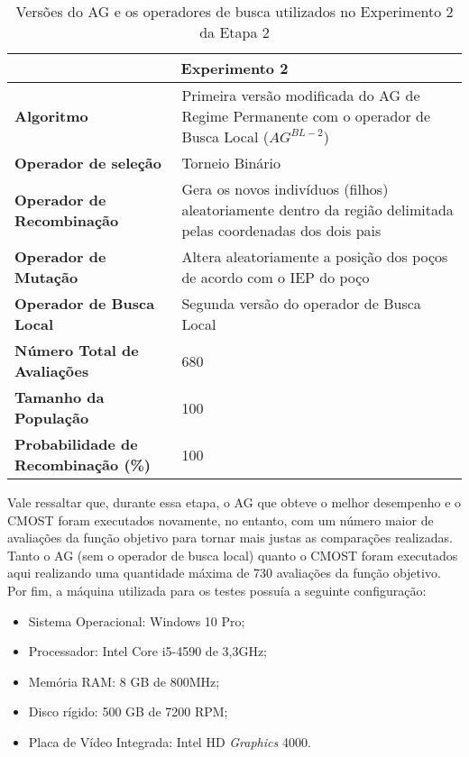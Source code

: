 \begin{table}[H]
\centering
\caption{Versões do AG e os operadores de busca utilizados no Experimento 2 da Etapa 2}
\label{table:con07}
\begin{tabular}{|p{6cm}|p{9cm}|}
\hline

\multicolumn{2}{|c|}{\textbf{Experimento 2}} \\ \hline
\textbf{Algoritmo} & Primeira versão modificada do AG de Regime Permanente com o operador de Busca Local ($AG^{BL-2}$) \\ \hline
\textbf{Operador de seleção} & Torneio Binário \\ \hline
\textbf{Operador de Recombinação} & Gera os novos indivíduos (filhos) aleatoriamente dentro da região delimitada pelas coordenadas dos dois pais \\  \hline
\textbf{Operador de Mutação} & Altera aleatoriamente a posição dos poços de acordo com o IEP do poço \\ \hline
\textbf{Operador de Busca Local} & Segunda versão do operador de Busca Local \\ \hline
\textbf{Número Total de Avaliações} & 680 \\ \hline
\textbf{Tamanho da População} & 100 \\ \hline
\textbf{Probabilidade de Recombinação (\%)} & 100 \\ \hline
\end{tabular}
\end{table}

Vale ressaltar que, durante essa etapa, o AG que obteve o melhor desempenho e o CMOST foram executados novamente, no entanto, com um número maior de avaliações da função objetivo para tornar mais justas as comparações realizadas. Tanto o AG (sem o operador de busca local) quanto o CMOST foram executados aqui realizando uma quantidade máxima de 730 avaliações da função objetivo. Por fim, a máquina utilizada para os testes possuía a seguinte configuração: 

\begin{itemize}
\item Sistema Operacional: Windows 10 Pro;
\item Processador: Intel Core i5-4590 de 3,3GHz;
\item Memória RAM: 8 GB de 800MHz;
\item Disco rígido: 500 GB de 7200 RPM;
\item Placa de Vídeo Integrada: Intel HD \textit{Graphics} 4000.
\end{itemize}

